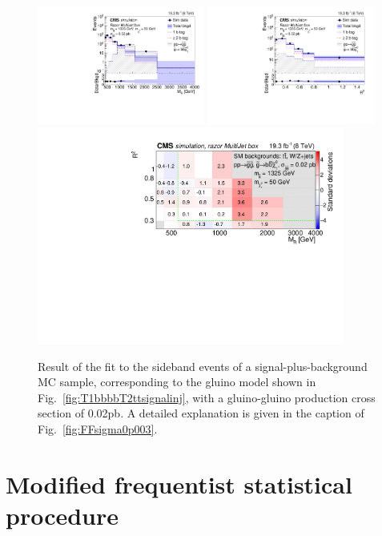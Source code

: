 \begin{figure}[htb!]
\centering
\includegraphics[width=0.49\textwidth]{figs/analysis8TeV/MR_T1bbbb_0p02_MultiJet.pdf}
\includegraphics[width=0.49\textwidth]{figs/analysis8TeV/RSQ_T1bbbb_0p02_MultiJet.pdf}
\includegraphics[width=0.9\textwidth]{figs/analysis8TeV/nSigmaLog_0p02_MultiJet.pdf}
\caption{Result of the fit to the sideband events of a
  signal-plus-background MC sample, corresponding to the gluino model
  shown in Fig.~\ref{fig:T1bbbbT2ttsignalinj}, with a gluino-gluino production cross section of 0.02\unit{pb}. A detailed explanation is
  given in the caption of Fig.~\ref{fig:FFsigma0p003}.\label{fig:FFsigma0p02}}
\end{figure}

\section{Modified frequentist statistical procedure}
\label{sec:limit8TeV}


